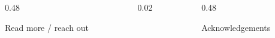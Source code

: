 \documentclass[final]{beamer}
\newlength{\onecolwid}
\newlength{\twocolwid}
\begin{document}
\begin{frame}[t]
\begin{columns}[t]
\begin{column}{\twocolwid}
\begin{columns}[t,totalwidth=\twocolwid]
\begin{column}{0.48\twocolwid}
\begin{alertblock}{Read more / reach out}
%
%
%
%
%
%
%
%
%
%
%
%
%
%
%
%
%
%


\end{alertblock}


\end{column}


\begin{column}{0.02\twocolwid}
\end{column}





\begin{column}{0.48\twocolwid}






\begin{block}{\large{Acknowledgements}}

\begin{footnotesize}


\end{footnotesize}
\end{block}
\end{column}
\end{columns}
\end{column}
\end{columns}
\end{frame}
\end{document}
